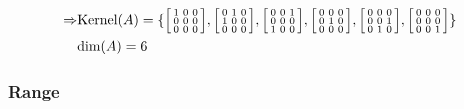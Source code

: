 \documentclass{article}
\begin{document}
\begin{equation}
\begin{split}
\Rightarrow & \text{Kernel}(A)=\{\begin{bsmallmatrix}1&0&0\\0&0&0\\0&0&0\end{bsmallmatrix},\begin{bsmallmatrix}0&1&0\\1&0&0\\0&0&0\end{bsmallmatrix},\begin{bsmallmatrix}0&0&1\\0&0&0\\1&0&0\end{bsmallmatrix},\begin{bsmallmatrix}0&0&0\\0&1&0\\0&0&0\end{bsmallmatrix},\begin{bsmallmatrix}0&0&0\\0&0&1\\0&1&0\end{bsmallmatrix},\begin{bsmallmatrix}0&0&0\\0&0&0\\0&0&1\end{bsmallmatrix}\}\\
&\text{dim}(A)=6
\end{split}
\end{equation}

\subsubsection{Range}

~
\end{document}
